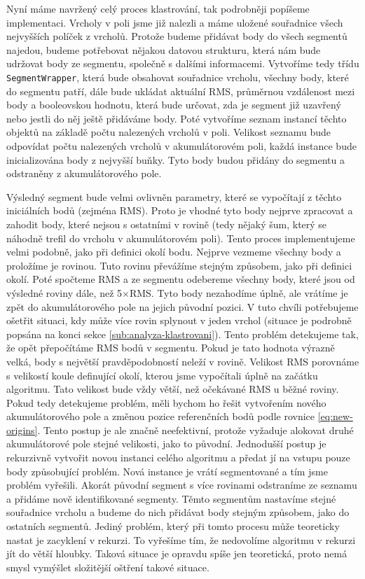 \documentclass[11pt,twoside,a4paper]{book}
\begin{document}
Nyní máme navržený celý proces klastrování, tak podrobněji popíšeme implementaci. Vrcholy v poli jsme již nalezli a máme uložené souřadnice všech nejvyšších políček z vrcholů. Protože budeme přidávat body do všech segmentů najedou, budeme potřebovat nějakou datovou strukturu, která nám bude udržovat body ze segmentu, společně s dalšími informacemi. Vytvoříme tedy třídu \verb|SegmentWrapper|, která bude obsahovat souřadnice vrcholu, všechny body, které do segmentu patří, dále bude ukládat aktuální RMS, průměrnou vzdálenost mezi body a booleovskou hodnotu, která bude určovat, zda je segment již uzavřený nebo jestli do něj ještě přidáváme body. Poté vytvoříme seznam instancí těchto objektů na základě počtu nalezených vrcholů v poli. Velikost seznamu bude odpovídat počtu nalezených vrcholů v akumulátorovém poli, každá instance bude inicializována body z nejvyšší buňky. Tyto body budou přidány do segmentu a odstraněny z akumulátorového pole.

Výsledný segment bude velmi ovlivněn parametry, které se vypočítají z těchto iniciálních bodů (zejména RMS). Proto je vhodné tyto body nejprve zpracovat a zahodit body, které nejsou s ostatními v rovině (tedy nějaký šum, který se náhodně trefil do vrcholu v akumulátorovém poli). Tento proces implementujeme velmi podobně, jako při definici okolí bodu. Nejprve vezmeme všechny body a proložíme je rovinou. Tuto rovinu převážíme stejným způsobem, jako při definici okolí. Poté spočteme RMS a ze segmentu odebereme všechny body, které jsou od výsledné roviny dále, než 5$\times$RMS. Tyto body nezahodíme úplně, ale vrátíme je zpět do akumulátorového pole na jejich původní pozici. V tuto chvíli potřebujeme ošetřit situaci, kdy může více rovin splynout v jeden vrchol (situace je podrobně popsána na konci sekce \ref{sub:analyza-klastrovani}). Tento problém detekujeme tak, že opět přepočítáme RMS bodů v segmentu. Pokud je tato hodnota výrazně velká, body s největší pravděpodobností neleží v rovině. Velikost RMS porovnáme s velikostí koule definující okolí, kterou jsme vypočítali úplně na začátku algoritmu. Tato velikost bude vždy větší, než očekávané RMS u běžné roviny. Pokud tedy detekujeme problém, měli bychom ho řešit vytvořením nového akumulátorového pole a změnou pozice referenčních bodů podle rovnice \ref{eq:new-origins}. Tento postup je ale značně neefektivní, protože vyžaduje alokovat druhé akumulátorové pole stejné velikosti, jako to původní. Jednodušší postup je rekurzivně vytvořit novou instanci celého algoritmu a předat jí na vstupu pouze body způsobující problém. Nová instance je vrátí segmentované a tím jsme problém vyřešili. Akorát původní segment s více rovinami odstraníme ze seznamu a přidáme nově identifikované segmenty. Těmto segmentům nastavíme stejné souřadnice vrcholu a budeme do nich přidávat body stejným způsobem, jako do ostatních segmentů. Jediný problém, který při tomto procesu může teoreticky nastat je zacyklení v rekurzi. To vyřešíme tím, že nedovolíme algoritmu v rekurzi jít do větší hloubky. Taková situace je opravdu spíše jen teoretická, proto nemá smysl vymýšlet složitější oštření takové situace.
\end{document}
